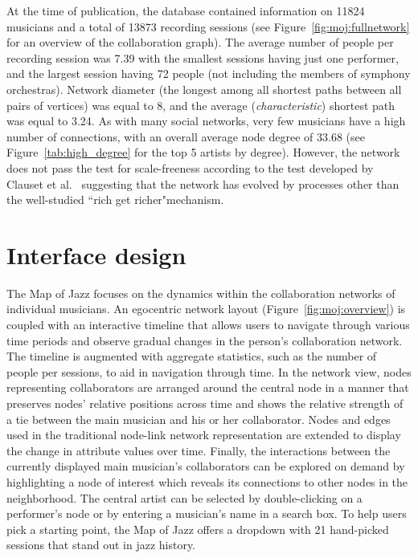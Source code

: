 \documentclass[12pt]{cmuthesis}
\begin{document}
  At the time of publication, the database contained information on 11824 musicians and a total of 13873 recording sessions (see Figure~\ref{fig:moj:fullnetwork} for an overview of the collaboration graph). The average number of people per recording session was 7.39 with the smallest sessions having just one performer, and the largest session having 72 people (not including the members of symphony orchestras). Network diameter (the longest among all shortest paths between all pairs of vertices) was equal to 8, and the average (\emph{characteristic}) shortest path was equal to 3.24. As with many social networks, very few musicians have a high number of connections, with an overall average node degree of 33.68 (see Figure~\ref{tab:high_degree} for the top 5 artists by degree). However, the network does not pass the test for scale-freeness according to the test developed by Clauset et al.~\cite{Clauset2009b} suggesting that the network has evolved by processes other than the well-studied ``rich get richer"mechanism.



\section{Interface design}


  The Map of Jazz focuses on the dynamics within the collaboration networks of individual musicians. An egocentric network layout (Figure~\ref{fig:moj:overview}) is coupled with an interactive timeline that allows users to navigate through various time periods and observe gradual changes in the person's collaboration network. The timeline is augmented with aggregate statistics, such as the number of people per sessions, to aid in navigation through time. In the network view, nodes representing collaborators are arranged around the central node in a manner that preserves nodes' relative positions across time and shows the relative strength of a tie between the main musician and his or her collaborator. Nodes and edges used in the traditional node-link network representation are extended to display the change in attribute values over time. Finally, the interactions between the currently displayed main musician's collaborators can be explored on demand by highlighting a node of interest which reveals its connections to other nodes in the neighborhood. The central artist can be selected by double-clicking on a performer's node or by entering a musician's name in a search box. To help users pick a starting point, the Map of Jazz offers a dropdown with 21 hand-picked sessions that stand out in jazz history.
\end{document}
